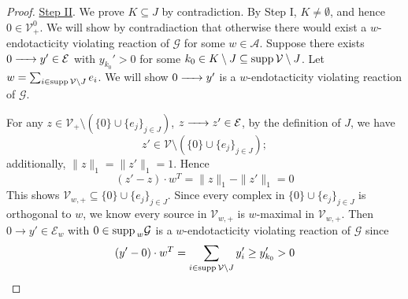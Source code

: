 \documentclass[10pt]{amsart}
\numberwithin{equation}{section}
\theoremstyle{plain}
\theoremstyle{definition}
\theoremstyle{remark}
\newcommand{\cE}{\mathcal{E}}
\newcommand{\cG}{\mathcal{G}}
\newcommand{\cV}{\mathcal{V}}
\newcommand{\supp}{{\rm supp\,}}
\begin{document}
\begin{proof}
\noindent \underline{Step II}. We prove $K\subseteq J$ by contradiction. By Step I, $K\neq\emptyset$, and hence  $0\in\cV_+^0$. We will show by contradiaction that otherwise there would exist a $w$-endotacticity violating reaction of $\cG$ for some $w\in\mathcal{A}$.  Suppose there exists $0\ce{->} y'\in\cE$ with $y_{k_0}'>0$ for some $k_0\in K\setminus J\subseteq\supp\cV\setminus J$.  Let $w=\sum_{i\in\supp\cV\setminus J}e_{i}$. We will show $0\ce{->}y'$ is a $w$-endotacticity violating reaction of $\cG$.

For any $z\in \cV_+\setminus (\{0\}\cup\{e_{j}\}_{j\in J})$, $z\ce{->[]} z'\in\cE$, by the definition of $J$, we have $$z'\in \cV\setminus (\{0\}\cup\{e_{j}\}_{j\in J});$$ additionally, $\|z\|_1=\|z'\|_1=1$. Hence $$(z'-z)\cdot w^T=\|z\|_1-\|z'\|_1=0$$ This shows $\cV_{w,+}\subseteq \{0\}\cup\{e_{j}\}_{j\in J}$. Since every complex in $\{0\}\cup\{e_{j}\}_{j\in J}$ is orthogonal to $w$, we know every source in $\cV_{w,+}$ is $w$-maximal in $\cV_{w,+}$. Then $0\to y'\in\cE_w$ with $0\in\supp_w\cG$ is a $w$-endotacticity violating reaction of $\cG$ since $$(y'-0)\cdot w^T=\sum_{i\in\supp\cV\setminus J}y'_{i}\ge y_{k_0}'>0$$ 
\medskip


\end{proof}
\end{document}
